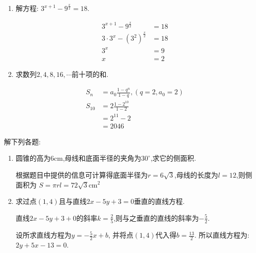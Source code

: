 \documentclass[answers]{exam}
\begin{document}
\begin{questions}
	\begin{enumerate}[label=(\arabic*)]
		\item 解方程: $3^{x+1} - 9^{\frac{x}{2}} = 18$.
		      \begin{solution}
			      \begin{align*}
				      3^{x+1} - 9^{\frac{x}{2}}        & = 18 \\
				      3\cdot 3^x - (3^2)^{\frac{x}{2}} & = 18 \\
				      3^x                              & = 9  \\
				      x                                & = 2
			      \end{align*}
		      \end{solution}
		\item 求数列$2,4,8,16,\cdots $前十项的和.
		      \begin{solution}
			      \begin{align*}
				      S_n    & = a_0\frac{1-q^n}{1-q}, (q=2, a_0=2) \\
				      S_{10} & = 2\frac{1-2^{10}}{1-2}              \\
				             & = 2^{11} - 2                         \\
				             & = 2046
			      \end{align*}
		      \end{solution}
	\end{enumerate}

	\question 解下列各题:
	\begin{enumerate}[label=(\arabic*)]
		\item 圆锥的高为$6$cm,母线和底面半径的夹角为$30^\circ$,求它的侧面积.
		      \begin{solution}
			      根据题目中提供的信息可计算得底面半径为$r = 6\sqrt{3}$,母线的长度为$l = 12$,则侧面积为
			      \begin{math}
				      S = \pi r l = 72\sqrt{3} \text{cm}^2
			      \end{math}
		      \end{solution}
		\item 求过点$(1,4)$且与直线$2x - 5y + 3 = 0$垂直的直线方程.
		      \begin{solution}
			      直线$2x - 5y + 3 + 0$的斜率$k=\frac25$,则与之垂直的直线的斜率为$-\frac52$.

			      设所求直线方程为$y =
				      -\frac52x+b$, 并将点$(1,4)$代入得$b = \frac{13}{2}$.
			      所以直线方程为:$2y + 5x - 13 = 0$.
		      \end{solution}
	\end{enumerate}


\end{questions}
\end{document}
